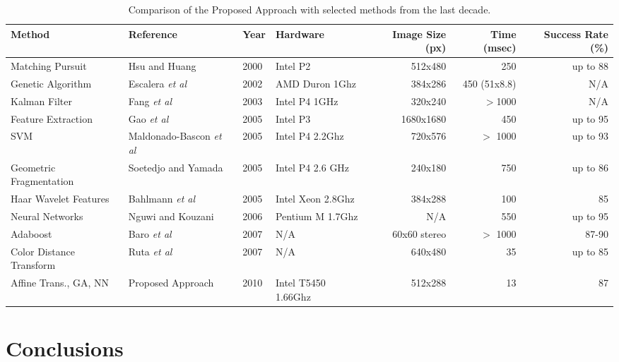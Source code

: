 \documentclass[review,number]{elsarticle}
\begin{document}
\begin{table}
\centering
\caption{Comparison of the Proposed Approach with selected methods from the last decade.}
\label{tab:perf}
\begin{tabular}{|p{19mm}|p{15mm}|l|l|r|r|r|}
\hline
{\bf Method} & {\bf Reference} & {\bf Year} & {\bf Hardware} & {\bf Image Size (px)} & {\bf Time (msec)} & {\bf Success Rate (\%)} \\
\hline
Matching Pursuit &        Hsu and Huang~\cite{signbib05}&       2000 &   Intel P2 &    512x480 &       ~250 &   up to 88 \\
\hline
Genetic Algorithm &   Escalera \textit{et al}~\cite{signbib10}&       2002 & AMD Duron 1Ghz &    384x286 & ~450 (51x8.8) &        N/A \\
\hline
Kalman Filter &       Fang \textit{et al}~\cite{Fang03}&       2003 & Intel P4 1GHz &    320x240 &      $>$1000 &        N/A \\
\hline
Feature Extraction &        Gao \textit{et al}~\cite{Gao2006}&       2005 &   Intel P3 &  1680x1680 &       ~450 &   up to 95 \\
\hline
       SVM &     Maldonado-Bascon \textit{et al}~\cite{Maldonadobascon07}&       2005 & Intel P4 2.2Ghz &    720x576 &      $>$ 1000 &   up to 93 \\
\hline
Geometric Fragmentation &   Soetedjo and Yamada~\cite{signbib11} &       2005 & Intel P4 2.6 GHz &    240x180 &       ~750 &   up to 86 \\
\hline
Haar Wavelet Features &   Bahlmann \textit{et al}~\cite{Bahlmann05}&       2005 & Intel Xeon 2.8Ghz &    384x288 &       ~100 &         85 \\
\hline
Neural Networks &      Nguwi and Kouzani~\cite{nguwi08}&       2006 & Pentium M 1.7Ghz &        N/A &       ~550 &   up to 95 \\
\hline
  Adaboost &       Baro \textit{et al}~\cite{baro09}&       2007 &        N/A & 60x60 stereo &      $>$ 1000 &      87-90 \\
\hline
Color Distance Transform &       Ruta \textit{et al}~\cite{signbib19}&       2007 &        N/A &    640x480 &        ~35 &   up to 85 \\
\hline
Affine Trans., GA, NN & Proposed Approach &       2010 & Intel T5450 1.66Ghz &    512x288 &        ~13 &         87 \\
\hline
\end{tabular}  
\end{table}

\section{Conclusions}
\label{sec:conc}
\end{document}
